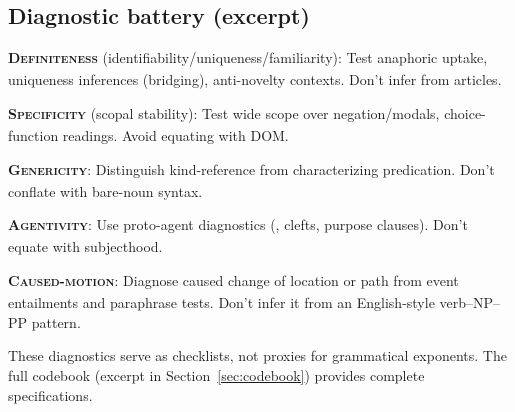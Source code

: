 \documentclass[12pt]{article}
\begin{document}
\subsection{Diagnostic battery (excerpt)}\label{subsec:diagnostic-battery}

\ea
\ex\label{ex:definiteness-cc} \textbf{\textsc{Definiteness}\textsubscript{\Cross}} (identifiability/uniqueness/familiarity): Test anaphoric uptake, uniqueness inferences (bridging), anti-novelty contexts. Don't infer from articles.

\ex\label{ex:specificity-cc} \textbf{\textsc{Specificity}\textsubscript{\Cross}} (scopal stability): Test wide scope over negation/modals, choice-function readings. Avoid equating with DOM.

\ex\label{ex:genericity-cc} \textbf{\textsc{Genericity}\textsubscript{\Cross}}: Distinguish kind-reference from characterizing predication. Don't conflate with bare-noun syntax.

\ex\label{ex:agentivity-cc} \textbf{\textsc{Agentivity}\textsubscript{\Cross}}: Use proto-agent diagnostics (, clefts, purpose clauses). Don't equate with subjecthood.

\ex\label{ex:caused-motion-cc} \textbf{\textsc{Caused-motion}\textsubscript{\Cross}}: Diagnose caused change of location or path from event entailments and paraphrase tests. Don't infer it from an English-style verb--NP--PP pattern.
\z

These diagnostics serve as checklists, not proxies for grammatical exponents. The full codebook (excerpt in Section~\ref{sec:codebook}) provides complete specifications.
\end{document}
